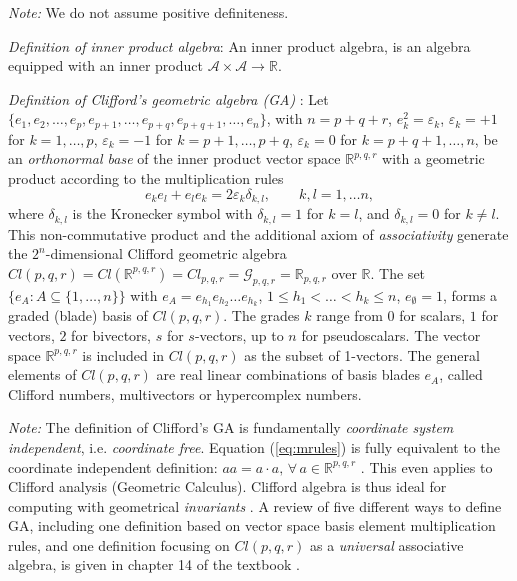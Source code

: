 \documentclass[cameraready]{jcmsi}%
\newcommand{\R}{\mathbb{R}}
\newcommand{\be}{\begin{equation}}
\newcommand{\ee}{\end{equation}}
\begin{document}
\textit{Note:} We do not assume positive definiteness. 

\textit{Definition of inner product algebra}:
An inner product algebra, is an algebra equipped with an inner product $\mathcal{A} \times \mathcal{A} \rightarrow \R$.

\textit{Definition of Clifford's geometric algebra (GA)} \cite{FM:ICNAAM2007,PL:CAandSpin}: 
Let $\{e_1, e_2, \ldots , e_p, e_{p+1}, \ldots , e_{p+q}, e_{p+q+1}, \ldots, e_n \}$, with $n=p+q+r$, $e_k^2=\varepsilon_k$, $\varepsilon_k = +1$ for $k=1, \ldots , p$, $\varepsilon_k = -1$ for $k=p+1, \ldots , p+q$, $\varepsilon_k = 0$ for $k=p+q+1, \ldots , n$,  be an \textit{orthonormal base} of the inner product vector space $\R^{p,q,r}$ with a geometric product according to the multiplication rules 
\be
  e_k e_l + e_l e_k = 2 \varepsilon_k \delta_{k,l}, 
  \qquad k,l = 1, \ldots n,
\label{eq:mrules}
\ee
where $\delta_{k,l}$ is the Kronecker symbol with $\delta_{k,l}= 1$ for $k=l$, and $\delta_{k,l}= 0$ for $k\neq l$. This non-commutative product and the additional axiom of \textit{associativity} generate the $2^n$-dimensional Clifford geometric algebra $Cl(p,q,r) = Cl(\R^{p,q,r}) = Cl_{p,q,r} = \mathcal{G}_{p,q,r} = \R_{p,q,r}$ over $\R$. The set $\{ e_A: A\subseteq \{1, \ldots ,n\}\}$ with $e_A = e_{h_1}e_{h_2}\ldots e_{h_k}$, $1 \leq h_1< \ldots < h_k \leq n$, $e_{\emptyset}=1$, forms a graded (blade) basis of $Cl(p,q,r)$. The grades $k$ range from $0$ for scalars, $1$ for vectors, $2$ for bivectors, $s$ for $s$-vectors, up to $n$ for pseudoscalars. 
The vector space $\R^{p,q,r}$ is included in $Cl(p,q,r)$ as the subset of 1-vectors. The general elements of $Cl(p,q,r)$ are real linear combinations of basis blades $e_A$, called Clifford numbers, multivectors or hypercomplex numbers.

\textit{Note:} The definition of Clifford's GA is fundamentally \textit{coordinate system independent}, i.e. \textit{coordinate free}. Equation (\ref{eq:mrules}) is fully equivalent to the coordinate independent definition: $aa = a\cdot a, \, \forall \, a \in \R^{p,q,r}$ \cite{HS:CAtoGC}. This even applies to Clifford analysis (Geometric Calculus). Clifford algebra is thus ideal for computing with geometrical \textit{invariants} \cite{HL:IAandGR}. A review of five different ways to define GA, including one definition based on vector space basis element multiplication rules, and one definition focusing on $Cl(p,q,r)$ as a \textit{universal} associative algebra, is given in chapter 14 of the textbook \cite{PL:CAandSpin}.
\end{document}
